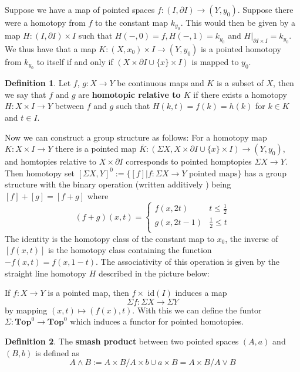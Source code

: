 \documentclass{article}
\theoremstyle{definition}
\newtheorem{defn}{Definition}[section]
\newcommand{\cat}{\mathbf}
\begin{document}
Suppose we have a map of pointed spaces $f:(I,\partial I)\rightarrow (Y,y_{0})$. Suppose there were a homotopy from $f$ to the constant map $k_{y_{0}}$. This would then be given by a map $H:(I,\partial I)\times I$ such that $H(-,0)=f,H(-,1)=k_{y_{0}}$ and $H|_{\partial I\times I}=k_{y_{0}}.$ We thus have that a map $K:(X,x_{0})\times I\rightarrow (Y,y_{0})$ is a pointed homotopy from $k_{y_{0}}$ to itself if and only if $(X\times\partial I\cup\{x\}\times I)$ is mapped to $y_{0}.$
\begin{defn}
Let $f$, $g: X \rightarrow Y$ be continuous maps and $K$ is a subset of $X$, then we say that $f$ and $g$ are \textbf{homotopic relative to $K$} if there exists a homotopy $H: X\times I \rightarrow Y$ between $f$ and $g$ such that $H(k,t)=f(k)=h(k)$ for $k\in K$ and $t\in I$. 
\end{defn}
Now we can construct a group structure as follows: For a homotopy map $K:X\times I\rightarrow Y$ there is a pointed map $\bar{K}:(\Sigma X, X\times\partial I\cup\{x\}\times I)\rightarrow (Y,y_{0})$, and homtopies relative to $X \times \partial I$ corresponds to pointed homptopies $\Sigma X \rightarrow Y$. Then homotopy set $[\Sigma X, Y]^0:=\{[f]|f: \Sigma X \rightarrow Y \,\, \text{pointed maps} \}$ has a group structure with the binary operation (written additively ) being $[f]+[g]=[f+g]$ where $$(f+g)(x,t)= \begin{cases} 
      f(x,2t) & t\leq \frac{1}{2} \\
      g(x,2t-1) & \frac{1}{2}\leq t \\
   \end{cases}$$
   The identity is the homotopy class of the constant map to $x_0$, the inverse of $[f(x,t)]$ is the homotopy class containing the function $-f(x,t)=f(x,1-t)$. The associativity
of this operation is given by the straight line homotopy $H$ described in the picture below: \begin{center}
\end{center}If $f:X \rightarrow Y$ is a pointed map, then $f \times$ id$(I)$ induces a map  $$\Sigma f: \Sigma X \rightarrow \Sigma Y $$ by mapping $(x,t)\mapsto (f(x),t)$. With this we can define the funtor $\Sigma : \cat{Top}^0 \rightarrow \cat{Top}^0$ which induces a functor for pointed homotopies.  
   \begin{defn}
   The \textbf{smash product} between two pointed spaces $(A,a)$ and $(B,b)$ is defined as $$A \wedge B:= A\times B / A \times b \cup a \times B=A\times B / A \lor B$$
   \end{defn}
\end{document}
